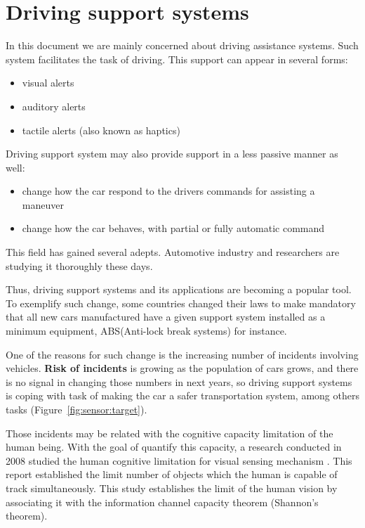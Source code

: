 \section{Driving support systems}

In this document we are mainly concerned about driving assistance systems. Such system facilitates the task of driving. This support can appear in several forms: 

\begin{itemize}
\item visual alerts
\item auditory alerts
\item tactile alerts (also known as haptics\cite{riener2010sensor})
\end{itemize}

Driving support system may also provide support in a less passive manner as well:

\begin{itemize}
\item change how the car respond to the drivers commands for assisting a maneuver
\item change how the car behaves, with partial or fully automatic command
\end{itemize}

This field has gained several adepts. Automotive industry and researchers are studying it thoroughly these days.

Thus, driving support systems and its applications are becoming a popular tool. To exemplify such change, some countries changed their laws to make mandatory that all new cars manufactured have a given support system installed as a minimum equipment, ABS(Anti-lock break systems)  for instance.

One of the reasons for such change is the increasing number of incidents involving vehicles. \textbf{Risk of incidents} is growing as the population of cars grows, and there is no signal in changing those numbers in next years, so driving support systems is coping with task of making the car a safer transportation system, among others tasks (Figure~\ref{fig:sensor:target}).

Those incidents may be related with the cognitive capacity limitation of the human being. With the goal of quantify this capacity, a research conducted in 2008 studied the human cognitive limitation for visual sensing mechanism \cite{LautarutisV}. This report established the limit number of objects which the human is capable of track simultaneously. This study establishes the limit of the human vision by associating it with the information channel capacity theorem (Shannon's theorem). 

